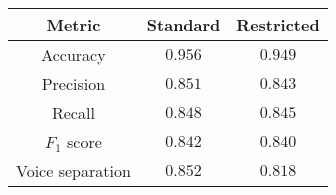 \begin{tabular}{ccc}
    \textbf{Metric}  & \textbf{Standard} & \textbf{Restricted} \\\hline
    Accuracy         & $0.956$           & $0.949$                \\
    Precision        & $0.851$           & $0.843$                \\
    Recall           & $0.848$           & $0.845$                \\
    $F_1$ score      & $0.842$           & $0.840$                \\
    Voice separation & $0.852$           & $0.818$                \\
\end{tabular}
